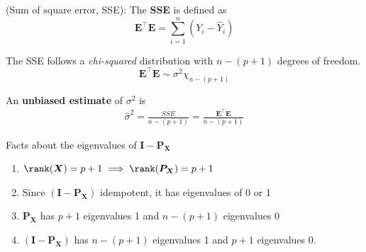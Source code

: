 \begin{definition}
    (Sum of square error, SSE): The \textbf{SSE} is defined as 
    \[
        \bm{E}^{\top}\bm{E} = \sum\limits_{i = 1}^{n}  (Y_i - \hat{Y}_i)
    \]
\end{definition}

\begin{result}
    The SSE follows a \textit{chi-squared} distribution with $n - (p + 1)$ degrees of freedom. \\
    \[
        \bm{E}^{\top}\bm{E} \sim \sigma^2 \chi_{n - (p + 1)}
    \]
\end{result}

\begin{result}
    An \textbf{unbiased estimate} of $\sigma^2$ is 
    \begin{align*}
        \hat{\sigma}^2 = \frac{ SSE}{n - (p + 1)} = \frac{\bm{E}^{\top}\bm{E}}{n - (p + 1)}
    \end{align*}
\end{result}

\begin{result}
    Facts about the eigenvalues of $\bm{I} - \bm{P_X}$ 
    \begin{enumerate}
        \item $\rank(\bm{X}) = p + 1 \implies \rank(\bm{P_X}) = p + 1$
        \item Since $(\bm{I} - \bm{P_X})$ idempotent, it has eigenvalues of 0 or 1 
        \item $\bm{P_X}$ has $p+1$ eigenvalues 1 and $n- (p + 1)$ eigenvalues $0$ 
        \item $(\bm{I - \bm{P_X}})$ has $n - (p + 1)$ eigenvalues 1 and $p + 1$ eigenvalues $0$.
    \end{enumerate}
\end{result}


